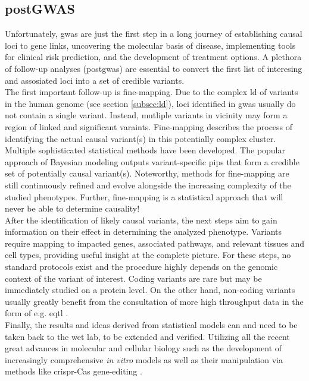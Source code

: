     \subsection{postGWAS}
    \label{subsec:gwas_limit}
    Unfortunately, \ac{gwas} are just the first step in a long journey of establishing causal loci to gene links, uncovering the molecular basis of disease, implementing tools for clinical risk prediction, and the development of treatment options. A plethora of follow-up analyses (post\ac{gwas}) are essential to convert the first list of interesing and assosiated loci into a set of credible variants.\\
    The first important follow-up is fine-mapping. Due to the complex \ac{ld} of variants in the human genome (see section \ref{subsec:ld}), loci identified in \ac{gwas} usually do not contain a single variant. Instead, mutliple variants in vicinity may form a region of linked and significant varaints. Fine-mapping describes the process of identifying the actual causal variant(s) in this potentially complex cluster. Multiple sophisticated statistical methods have been developed. The popular approach of Bayesian modeling outputs variant-specific \acp{pip} that form a credible set of potentially causal variant(s). Noteworthy, methods for fine-mapping are still continuously refined and evolve alongside the increasing complexity of the studied phenotypes. Further, fine-mapping is a statistical approach that will never be able to determine causality! \cite{schaidGenomewideAssociationsCandidate2018, uffelmannGenomewideAssociationStudies2021}\\
    After the identification of likely causal variants, the next steps aim to gain information on their effect in determining the analyzed phenotype. Variants require mapping to impacted genes, associated pathways, and relevant tissues and cell types, providing useful insight at the complete picture. For these steps, no standard protocols exist and the procedure highly depends on the genomic context of the variant of interest. Coding variants are rare but may be immediately studied on a protein level. On the other hand, non-coding variants usually greatly benefit from the consultation of more high throughput data in the form of e.g. \ac{eqtl} \cite{uffelmannGenomewideAssociationStudies2021}.\\
    Finally, the results and ideas derived from statistical models can and need to be taken back to the wet lab, to be extended and verified. Utilizing all the recent great advances in molecular and cellular biology such as the development of increasingly comprehensive \textit{in vitro} models as well as their manipulation via methods like \ac{crispr}-Cas gene-editing \cite{lichouFunctionalStudiesGWAS2020}.



